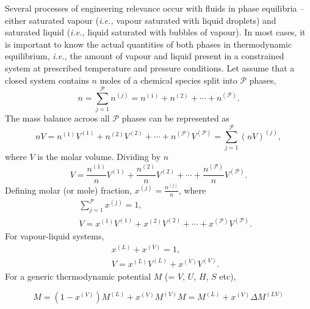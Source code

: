 \documentclass[12pts,a4paper,amsmath,amssymb,floatfix]{article}%
\newcommand{\frc}{\displaystyle\frac}
\newcommand{\ie}{{\it i.e., }}
\newcommand{\mfr}[3][error]{#1_{#2}^{\left(#3\right)}}
\begin{document}
Several processes of engineering relevance occur with fluids in phase equilibria -- either saturated vapour (\ie vapour saturated with liquid droplets) and saturated liquid (\ie liquid saturated with bubbles of vapour). In most cases, it is important to know the actual quantities of both phases in thermodynamic equilibrium, \ie the amount of vapour and liquid present in a constrained system at prescribed temperature and pressure conditions. Let assume that a closed system contains $n$ moles of a chemical species split into $\mathcal{P}$ phases,
    \begin{displaymath}
      n = \sum\limits_{j=1}^{\mathcal{P}} \mfr[n]{}{j} = \mfr[n]{}{1} + \mfr[n]{}{2} + \cdots + \mfr[n]{}{\mathcal{P}}.
    \end{displaymath}
The mass balance acroos all $\mathcal{P}$ phases can be represented as
    \begin{displaymath}
       nV = \mfr[n]{}{1}\mfr[V]{}{1} + \mfr[n]{}{2}\mfr[V]{}{2} + \cdots + \mfr[n]{}{\mathcal{P}}\mfr[V]{}{\mathcal{P}}  = \sum\limits_{j=1}^{\mathcal{P}}\left(nV\right)^{\left(j\right)},
    \end{displaymath}
where $V$ is the molar volume. Dividing by $n$
    \begin{displaymath}
       V = \frc{\mfr[n]{}{1}}{n}\mfr[V]{}{1} + \frc{\mfr[n]{}{2}}{n}\mfr[V]{}{2} + \cdots + \frc{\mfr[n]{}{\mathcal{P}}}{n}\mfr[V]{}{\mathcal{P}}.
    \end{displaymath}
Defining molar (or mole) fraction, $\mfr[x]{}{j}=\frc{\mfr[n]{}{j}}{n}$, where
    \begin{eqnarray}
         && \sum\limits_{j=1}^{\mathcal{P}}\mfr[x]{}{j} = 1,  \nonumber \\
         && V = \mfr[x]{}{1}\mfr[V]{}{1} + \mfr[x]{}{2}\mfr[V]{}{2} + \cdots + \mfr[x]{}{\mathcal{P}}\mfr[V]{}{\mathcal{P}}.  \nonumber
    \end{eqnarray}
For vapour-liquid systems,
    \begin{eqnarray}
         && \mfr[x]{}{L} + \mfr[x]{}{V} = 1,  \nonumber \\
         && V = \mfr[x]{}{L}\mfr[V]{}{L} + \mfr[x]{}{V}\mfr[V]{}{V}. \nonumber
    \end{eqnarray}
For a generic thermodynamic potential $M$ (= $V$, $U$, $H$, $S$ etc),
    \begin{shaded}
       \begin{subequations}
           \begin{equation}
              M = \left(1-\mfr[x]{}{V}\right)\mfr[M]{}{L} + \mfr[x]{}{V}\mfr[M]{}{V}
           \end{equation}
           \begin{equation}
              M = \mfr[M]{}{L} + \mfr[x]{}{V}\Delta\mfr[M]{}{LV}\label{Mod03_QualityVapour}
           \end{equation}
       \end{subequations}
    \end{shaded}
\end{document}

